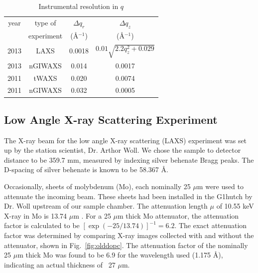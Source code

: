 \begin{table}[htbp]
  \centering
  \begin{tabular}{cccc}
    \hline
    year & type of  & $\Delta q_r$ & $\Delta q_z$ \\
       & experiment & (\AA$^{-1}$) & (\AA$^{-1}$) \\
    \hline
    2013 & LAXS    & 0.0018 & $0.01\sqrt{2.2q_z^2+0.029}$ \\
    2013 & nGIWAXS & 0.014 & 0.0017 \\
    2011 & tWAXS   & 0.020 & 0.0074 \\
    2011 & nGIWAXS & 0.032 & 0.0005\\ 
    \hline  
  \end{tabular}
  \caption{Instrumental resolution in $q$}
  \label{tab:instrumental_resolution}
\end{table}


\newpage
\subsection{Low Angle X-ray Scattering Experiment}\label{sec:LAXS_method}
The X-ray beam for the low angle X-ray scattering (LAXS) experiment 
was set up by the station scientist, Dr. Arthor Woll.
We chose the sample to detector distance to be 359.7 mm, measured by indexing
silver behenate Bragg peaks. The D-spacing of silver behenate is known to be
58.367 \AA.

Occasionally, sheets of molybdenum (Mo), each nominally 25 $\mu$m were 
used to attenuate the incoming beam. 
These sheets had been installed in the G1hutch by Dr. Woll upstream of our 
sample chamber.
The attenuation length $\mu$ of 10.55 keV X-ray in Mo is 13.74 $\mu$m \cite{ref:cxro}.
For a 25 $\mu$m thick Mo attenuator, the attenuation factor is calculated to be
$[\exp(-25/13.74)]^{-1} = 6.2$. The exact attenuation factor was determined
by comparing X-ray images collected with and without the attenuator, 
shown in Fig.~\ref{fig:olddopc}.
The attenuation factor of the nominally 25 $\mu$m thick Mo was found to 
be 6.9 for the wavelength used (1.175 \AA), indicating an actual thickness
of ~27 $\mu$m. 

